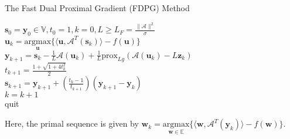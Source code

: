 \documentclass{beamer}
\begin{document}
\begin{frame}

\justifying
\begin{algorithm}[H]
			\caption{The Fast Dual Proximal Gradient (FDPG) Method}\label{alg:4}
			$\mathbf{s}_{0} = \mathbf{y}_{0} \in \mathbb{V}, t_{0} = 1, k = 0, L \geq L_{F} = \frac{\|\mathcal{A}\|^{2}}{\sigma}$\\
			{
				$\mathbf{u}_{k} = \underset{\mathbf{u}}{\mathrm{argmax}} \biggl\{ \langle \mathbf{u},\mathcal{A}^{T}(\mathbf{s}_{k}) \rangle - f(\mathbf{u}) \biggl\}$\\
				$\mathbf{y}_{k+1} = \mathbf{s}_{k} - \frac{1}{L} \mathcal{A}(\mathbf{u}_{k}) + \frac{1}{L} \text{prox}_{L g}(\mathcal{A}(\mathbf{u}_{k}) - L\mathbf{z}_{k})$\\
				$t_{k+1} = \frac{1 + \sqrt{1 + 4t_{k}^{2}}}{2}$\\
				$\mathbf{s}_{k+1} = \mathbf{y}_{k+1} + \left(\frac{t_{k}-1}{t_{k+1}}\right)(\mathbf{y}_{k+1} - \mathbf{y}_{k})$\\
				$k = k+1$\\
				{
					quit
				}
			}
\end{algorithm}

\vspace{0.2cm}
\justifying
Here, the primal sequence is given by $\mathbf{w}_{k} = \underset{\mathbf{w \in \mathbb{E}}}{\mathrm{argmax}} \biggl\{ \langle \mathbf{w},\mathcal{A}^{T}(\mathbf{y}_{k}) \rangle - f(\mathbf{w}) \biggl\}$.\\

\end{frame}
\end{document}
